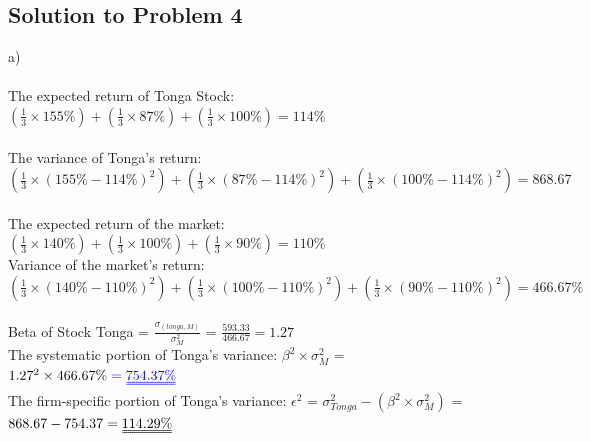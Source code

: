\documentclass[12]{article}
\begin{document}
{\large }
\color{blue}
\subsection*{Solution to Problem 4}
a)\\
\\
The expected return of Tonga Stock:\\
{\large $\left(\frac{1}{3} \times 155\% \right) + \left(\frac{1}{3} \times 87\% \right) + \left(\frac{1}{3} \times 100\% \right) = 114\%$}\\
\\
The variance of Tonga's return:\\
$\left(\frac{1}{3} \times (155\% - 114\%)^2  \right) + \left(\frac{1}{3} \times (87\% - 114\%)^2 \right) + \left(\frac{1}{3} \times (100\% - 114\%)^2 \right) = 868.67$\\
\\
The expected return of the market:\\
$\left(\frac{1}{3} \times 140\% \right) + \left(\frac{1}{3} \times 100\% \right) + \left(\frac{1}{3} \times 90\% \right) = 110\%$\\
Variance of the market's return:\\
$\left(\frac{1}{3} \times (140 \% - 110\%)^2 \right) + \left(\frac{1}{3} \times (100\% - 110\%)^2 \right) + \left(\frac{1}{3} \times (90\% - 110\%)^2 \right) = 466.67\%$\\
\\
Beta of Stock Tonga = {\large $\frac{\sigma_{(tonga, M)}}{\sigma_M^2}$ = $\frac{593.33}{466.67} = 1.27$}\\
The systematic portion of Tonga's variance: $\beta^2 \times \sigma_M^2$ = $1.27^2 \times 466.67\%\color{blue} = \uuline{754.37\%}$\\
The firm-specific portion of Tonga's variance: $\epsilon^2$ = $\sigma_{Tonga}^2 - (\beta^2 \times \sigma_M^2)$ = $868.67 - 754.37 = \uuline{114.29\%}$\\




\color{black}
\end{document}
